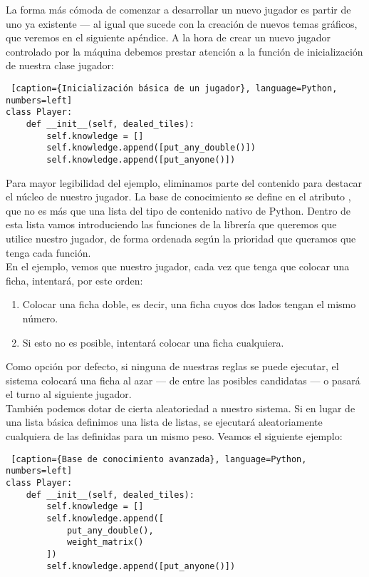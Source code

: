 La forma más cómoda de comenzar a desarrollar un nuevo jugador es partir de uno ya existente --- al igual que sucede
con la creación de nuevos temas gráficos, que veremos en el siguiente apéndice. A la hora de crear un nuevo jugador
controlado por la máquina debemos prestar atención a la función de inicialización de nuestra clase jugador:

\begin{lstlisting} [caption={Inicialización básica de un jugador}, language=Python, numbers=left]
class Player:
    def __init__(self, dealed_tiles):
        self.knowledge = []
        self.knowledge.append([put_any_double()])
        self.knowledge.append([put_anyone()])
\end{lstlisting}

Para mayor legibilidad del ejemplo, eliminamos parte del contenido para destacar el núcleo de nuestro jugador. La base de
conocimiento se define en el atributo , que no es más que una lista del tipo de contenido nativo de Python.
Dentro de esta lista vamos introduciendo las funciones de la librería que queremos que utilice nuestro jugador, de forma
ordenada según la prioridad que queramos que tenga cada función. \\

En el ejemplo, vemos que nuestro jugador, cada vez que tenga que colocar una ficha, intentará, por este orden:
\begin{enumerate}
    \item Colocar una ficha doble, es decir, una ficha cuyos dos lados tengan el mismo número.
    \item Si esto no es posible, intentará colocar una ficha cualquiera.
\end{enumerate}

Como opción por defecto, si ninguna de nuestras reglas se puede ejecutar, el sistema colocará una ficha al azar --- de entre
las posibles candidatas --- o pasará el turno al siguiente jugador. \\

También podemos dotar de cierta aleatoriedad a nuestro sistema. Si en lugar de una lista básica definimos una lista de listas,
se ejecutará aleatoriamente cualquiera de las definidas para un mismo peso. Veamos el siguiente ejemplo:

\begin{lstlisting} [caption={Base de conocimiento avanzada}, language=Python, numbers=left]
class Player:
    def __init__(self, dealed_tiles):
        self.knowledge = []
        self.knowledge.append([
            put_any_double(),
            weight_matrix()
        ])
        self.knowledge.append([put_anyone()])
\end{lstlisting}

